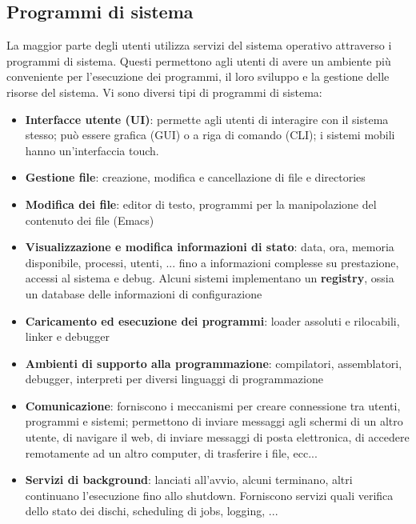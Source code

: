 \documentclass[12pt]{article}
\begin{document}
\subsection{Programmi di sistema}
La maggior parte degli utenti utilizza servizi del sistema operativo attraverso i programmi di sistema.
Questi permettono agli utenti di avere un ambiente più conveniente per l'esecuzione dei programmi, il loro sviluppo e la gestione delle risorse del sistema.
Vi sono diversi tipi di programmi di sistema:
\begin{itemize}
    \item \textbf{Interfacce utente (UI)}: permette agli utenti di interagire con il sistema stesso; può essere grafica (GUI) o a riga di comando (CLI); i sistemi mobili hanno un'interfaccia touch.
    \item \textbf{Gestione file}: creazione, modifica e cancellazione di file e directories
    \item \textbf{Modifica dei file}: editor di testo, programmi per la manipolazione del contenuto dei file (Emacs)
    \item \textbf{Visualizzazione e modifica informazioni di stato}: data, ora, memoria disponibile, processi, utenti, ... fino a informazioni complesse su prestazione, accessi al sistema e debug. Alcuni sistemi implementano un \textbf{registry}, ossia un database delle informazioni di configurazione
    \item \textbf{Caricamento ed esecuzione dei programmi}: loader assoluti e rilocabili, linker e debugger
    \item \textbf{Ambienti di supporto alla programmazione}: compilatori, assemblatori, debugger, interpreti per diversi linguaggi di programmazione
    \item \textbf{Comunicazione}: forniscono i meccanismi per creare connessione tra utenti, programmi e sistemi; permettono di inviare messaggi agli schermi di un altro utente, di navigare il web, di inviare messaggi di posta elettronica, di accedere remotamente ad un altro computer, di trasferire i file, ecc...
    \item \textbf{Servizi di background}: lanciati all'avvio, alcuni terminano, altri continuano l'esecuzione fino allo shutdown. Forniscono servizi quali verifica dello stato dei dischi, scheduling di jobs, logging, ...
\end{itemize}
\end{document}
